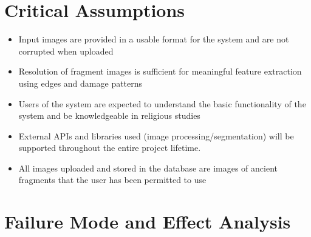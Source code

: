 \documentclass{article}
\begin{document}
\section{Critical Assumptions}

\begin{itemize}
    \item Input images are provided in a usable format for the system and are not corrupted when uploaded
    \item Resolution of fragment images is sufficient for meaningful feature extraction using edges and damage patterns
    \item Users of the system are expected to understand the basic functionality of the system and be knowledgeable in religious studies
    \item External APIs and libraries used (image processing/segmentation) will be supported throughout the entire project lifetime.
    \item All images uploaded and stored in the database are images of ancient fragments that the user has been permitted to use
\end{itemize}

\section{Failure Mode and Effect Analysis}
\end{document}
